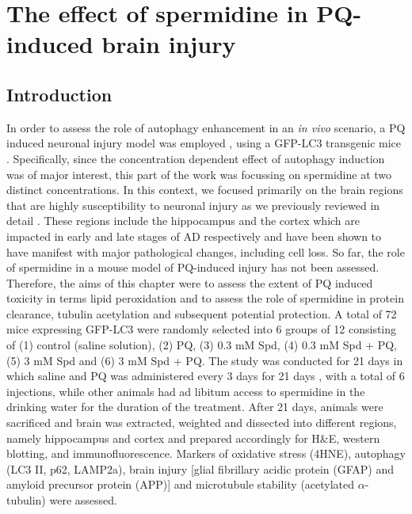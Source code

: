 \chapter{The effect of spermidine in PQ-induced brain injury}
\section{Introduction}
In order to assess the role of autophagy enhancement in an \textit{in vivo} scenario, a PQ induced neuronal injury model was employed \citep{Chen2012}, using a GFP-LC3 transgenic mice \citep{Mizushima2004a}. Specifically, since the concentration dependent effect of autophagy induction was of major interest, this part of the work was focussing on spermidine at two distinct concentrations. In this context, we focused primarily on the brain regions that are highly susceptibility to neuronal injury as we previously reviewed in detail \citep{lumkwana2017}. These regions include the hippocampus and the cortex which are impacted in early and late stages of AD respectively and have been shown to have manifest with major pathological changes, including cell loss. So far, the role of spermidine in a mouse model of PQ-induced injury has not been assessed. Therefore, the aims of this chapter were to assess the extent of PQ induced toxicity in terms lipid peroxidation and to assess the role of spermidine in protein clearance, tubulin acetylation and subsequent potential protection. A total of 72 mice expressing GFP-LC3 were randomly selected into 6 groups of 12 consisting of (1) control (saline solution), (2) PQ, (3) 0.3 mM Spd, (4) 0.3 mM Spd + PQ, (5) 3 mM Spd and (6) 3 mM Spd + PQ. The study was conducted for 21 days in which saline and PQ was administered every 3 days for 21 days \citep{Chen2012}, with a total of 6 injections, while other animals had ad libitum access to spermidine in the drinking water for the duration of the treatment. After 21 days, animals were sacrificed and brain was extracted, weighted and dissected into different regions, namely hippocampus and cortex and prepared accordingly for H\&E, western blotting, and immunofluorescence. Markers of oxidative stress (4HNE), autophagy (LC3 II, p62, LAMP2a), brain injury [glial fibrillary acidic protein (GFAP) and amyloid precursor protein (APP)] and microtubule stability (acetylated $\alpha$-tubulin) were assessed. 

